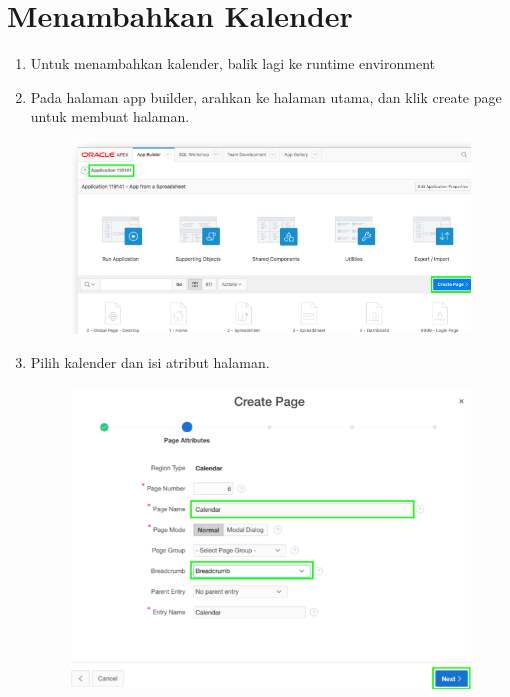 \section{Menambahkan Kalender}
\begin{enumerate}
    \item{Untuk menambahkan kalender, balik lagi ke runtime environment}
    \item{Pada halaman app builder, arahkan ke halaman utama, dan klik create page untuk membuat halaman.}
    
\begin{figure}[!htbp]
    \centering
    \includegraphics[scale=0.5]{section/gambar_bab2/kalender.png}
    \label{penanda}
\end{figure}
    \item{Pilih kalender dan isi atribut halaman.}
    
\begin{figure}[!htbp]
    \centering
    \includegraphics[scale=0.5]{section/gambar_bab2/kalender3.png}
    \label{penanda}
\end{figure}


\end{enumerate}
